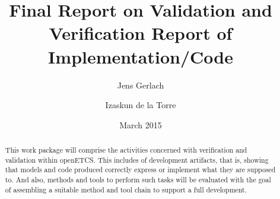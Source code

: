 \documentclass{template/openetcs_report}
\numberwithin{figure}{chapter}
\numberwithin{table}{chapter}
\begin{document}
\frontmatter
{}




\title{Final Report on Validation and Verification Report of Implementation/Code}


\date{March 2015}






\author{Jens Gerlach}

\author{Izaskun de la Torre}



\sloppy %

\begin{abstract}
  This work package will comprise the activities concerned with
  verification and validation within openETCS. This includes \vv of
  development artifacts, that is, showing that models and code
  produced correctly express or implement what they are supposed
  to. And also, methods and tools to perform such tasks will be
  evaluated with the goal of assembling a suitable method and tool
  chain to support a full development.
\end{abstract}
\end{document}
